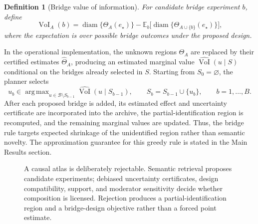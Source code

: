 \documentclass[11pt]{article}
\numberwithin{equation}{section}
\newtheorem{definition}{Definition}[section]
\DeclareMathOperator{\diam}{diam}
\DeclareMathOperator*{\argmax}{arg\,max}
\newcommand{\E}{\mathbb E}
\newcommand{\1}{\mathbf 1}
\newcommand{\cB}{\mathcal B}
\begin{document}
\begin{definition}[Bridge value of information]
For candidate bridge experiment \(b\), define
\[
  \operatorname{VoI}_A(b)
  =
  \diam\{\Theta_A(e_\star)\}
  -
  \E_b\big[\diam\{\Theta_{A\cup\{b\}}(e_\star)\}\big],
\]
where the expectation is over possible bridge outcomes under the proposed design.
\end{definition}

In the operational implementation, the unknown regions \(\Theta_A\) are replaced by their certified estimates \(\widehat\Theta_A\), producing an estimated marginal value \(\widehat{\operatorname{VoI}}(u\mid S)\) conditional on the bridges already selected in \(S\).  Starting from \(S_0=\varnothing\), the planner selects
\[
  u_b\in\argmax_{u\in\cB\setminus S_{b-1}}
  \widehat{\operatorname{VoI}}(u\mid S_{b-1}),
  \qquad
  S_b=S_{b-1}\cup\{u_b\},
  \qquad b=1,\ldots,B.
\]
After each proposed bridge is added, its estimated effect and uncertainty certificate are incorporated into the archive, the partial-identification region is recomputed, and the remaining marginal values are updated.  Thus, the bridge rule targets expected shrinkage of the unidentified region rather than semantic novelty.  The approximation guarantee for this greedy rule is stated in the Main Results section.

\begin{figure}[t]
\centering
{}
\caption{A causal atlas is deliberately rejectable.  Semantic retrieval proposes candidate experiments; debiased uncertainty certificates, design compatibility, support, and moderator sensitivity decide whether composition is licensed.  Rejection produces a partial-identification region and a bridge-design objective rather than a forced point estimate.}
\label{fig:pipeline}
\end{figure}
\end{document}
